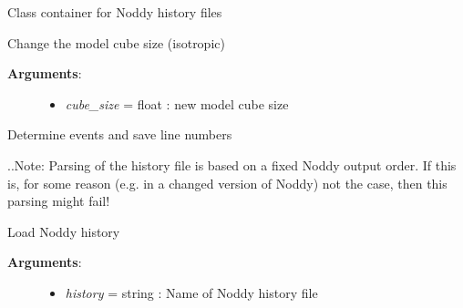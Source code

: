 \documentclass[letterpaper,10pt,english]{sphinxmanual}
\begin{document}
\begin{fulllineitems}
\label{pynoddy:pynoddy.history.NoddyHistory}
Class container for Noddy history files

\begin{fulllineitems}
\label{pynoddy:pynoddy.history.NoddyHistory.change_cube_size}
Change the model cube size (isotropic)
\begin{description}
\item[{\textbf{Arguments}:}] \leavevmode\begin{itemize}
\item {} 
\emph{cube\_size} = float : new model cube size

\end{itemize}

\end{description}

\end{fulllineitems}


\begin{fulllineitems}
\label{pynoddy:pynoddy.history.NoddyHistory.determine_events}
Determine events and save line numbers

..Note: Parsing of the history file is based on a fixed Noddy output order.
If this is, for some reason (e.g. in a changed version of Noddy) not the case, then
this parsing might fail!

\end{fulllineitems}


\begin{fulllineitems}
\label{pynoddy:pynoddy.history.NoddyHistory.load_history}
Load Noddy history
\begin{description}
\item[{\textbf{Arguments}:}] \leavevmode\begin{itemize}
\item {} 
\emph{history} = string : Name of Noddy history file


\end{itemize}
\end{description}
\end{fulllineitems}
\end{fulllineitems}
\end{document}
